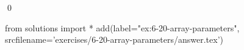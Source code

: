 
\begin{ex}
  \label{ex:6-20-array-parameters}
  
  \qed
\end{ex}
\begin{python0}
from solutions import *
add(label="ex:6-20-array-parameters",
    srcfilename='exercises/6-20-array-parameters/answer.tex')
\end{python0}
